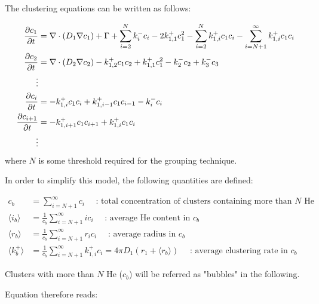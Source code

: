 The clustering equations can be written as follows:

\begin{subequations}
    \begin{align}
        \frac{\partial c_1}{\partial t} &= \nabla \cdot (D_1 \nabla c_1) + \Gamma + \sum\limits_{i=2}^N k_{i}^- c_i - 2k_{1, 1}^+ c_1^2 - \sum\limits_{i=2}^N k_{1,i}^+ c_1 c_i - \sum\limits_{i=N+1}^\infty k_{1,i}^+ c_1 c_i \\
        \frac{\partial c_2}{\partial t} &= \nabla \cdot (D_2 \nabla c_2) - k_{1, 2}^+ c_1 c_2 + k_{1, 1}^+ c_1^2 - k_{2}^- c_2 + k_{3}^- c_3\\
        \vdots \nonumber\\
        \frac{\partial c_i}{\partial t} &= - k_{1, i}^+ c_1 c_i + k_{1, i-1}^+ c_1 c_{i-1} - k_{i}^- c_i\\
        \frac{\partial c_{i+1}}{\partial t} &= - k_{1, i+1}^+ c_1 c_{i+1} + k_{1, i}^+ c_1 c_i\\
        \vdots \nonumber
    \end{align}
    \labeq{temporal evolution no grouping}
\end{subequations}
where $N$ is some threshold required for the grouping technique.

In order to simplify this model, the following quantities are defined:

\begin{align}
    c_b &= \sum\limits_{i=N+1}^\infty c_i \quad \text{ : total concentration of clusters containing more than $N$ He} \\
    \langle i_b \rangle &= \frac{1}{c_b} \sum\limits_{i=N+1}^\infty i c_i \quad \text{ : average He content in $c_b$} \\
    \langle r_b \rangle &=  \frac{1}{c_b}\sum\limits_{i=N+1}^\infty r_i c_i \quad \text{ : average radius in $c_b$}\\
    \langle k_b^+ \rangle &=  \frac{1}{c_b}\sum\limits_{i=N+1}^\infty k_{1,i}^+ c_i = 4 \pi D_1 (r_1 + \langle r_b \rangle) \quad \text{ : average clustering rate in $c_b$}
\end{align}

Clusters with more than $N$ He ($c_b$) will be referred as "bubbles" in the following.

Equation  therefore reads:

